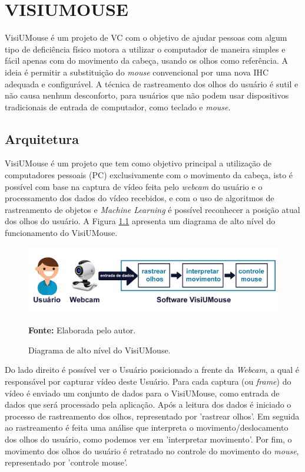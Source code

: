 \chapter{VISIUMOUSE}\label{CAP4}
VisiUMouse é um projeto de VC com o objetivo de ajudar pessoas com algum tipo de deficiência físico motora a utilizar o computador de maneira simples e fácil apenas com do movimento da cabeça, usando os olhos como referência. A ideia é permitir a substituição do \textit{mouse} convencional por uma nova IHC adequada e configurável. A técnica de  rastreamento dos olhos do usuário é sutil e não causa nenhum desconforto, para usuários que não podem usar dispositivos tradicionais de entrada de computador, como teclado e \textit{mouse}.

\section{Arquitetura}\label{Sub:funcionamento-visiumouse}
VisiUMouse é um projeto que tem como objetivo principal a utilização de computadores pessoais (PC) exclusivamente com o movimento da cabeça, isto é possível com base na captura de vídeo feita pelo \textit{webcam} do usuário e o processamento dos dados do vídeo recebidos, e com o uso de algoritmos de rastreamento de objetos e \textit{Machine Learning} é possível reconhecer a posição atual dos olhos do usuário. A Figura \ref{fig:projeto-diagrama-alto-nivel} apresenta um diagrama de alto nível do funcionamento do VisiUMouse. 

\begin{figure}[H]
\centering
\caption{Diagrama de alto nível do VisiUMouse.}
\includegraphics[scale=.23]{img/projeto-diagrama-alto-nivel.png}

{\fontsize{11}{11}\selectfont \textbf{Fonte:} Elaborada pelo autor.}
\label{fig:projeto-diagrama-alto-nivel}
\end{figure}


Do lado direito é possível ver o Usuário posicionado a frente da \textit{Webcam}, a qual é responsável por capturar vídeo deste Usuário. Para cada captura (ou \textit{frame}) do vídeo é enviado um conjunto de dados para o VisiUMouse, como entrada de dados que será processado pela aplicação. Após a leitura dos dados é iniciado o processo de rastreamento dos olhos, representado por 'rastrear olhos'. Em seguida ao rastreamento é feita uma análise que interpreta o movimento/deslocamento dos olhos do usuário, como podemos ver em 'interpretar movimento'. Por fim, o movimento dos olhos do usuário é retratado no controle do movimento do \textit{mouse}, representado por 'controle mouse'.


